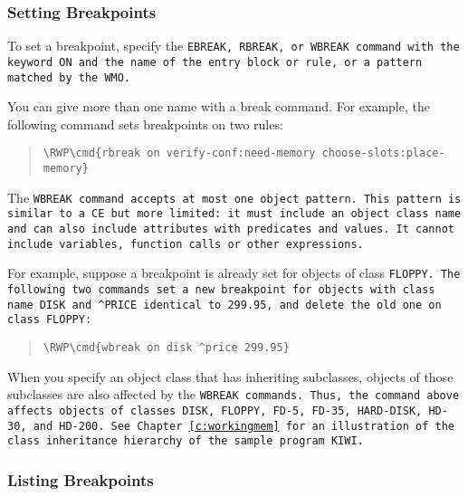 \subsubsection{Setting Breakpoints}

To set a breakpoint, specify the \tt{EBREAK}, \tt{RBREAK}, or
\tt{WBREAK} command with the keyword \tt{ON} and the name of the entry
block or rule, or a pattern matched by the WMO.

You can give more than one name with a break command. For example, the
following command sets breakpoints on two rules:
\begin{quote}
\begin{Verbatim}[commandchars=\\\{\}]
\RWP\cmd{rbreak on verify-conf:need-memory choose-slots:place-memory}
\end{Verbatim}
\end{quote}

The \tt{WBREAK} command accepts at most one object pattern. This
pattern is similar to a CE but more limited: it must include an
object class name and can also include attributes with
predicates and values. It cannot include variables, function
calls or other expressions.

For example, suppose a breakpoint is already set for objects of class
\tt{FLOPPY}. The following two commands set a new breakpoint for objects
with class name \tt{DISK} and \verb|^PRICE| identical to 299.95, and delete
the old one on class \tt{FLOPPY}:

\begin{quote}
\begin{Verbatim}[commandchars=\\\{\}]
\RWP\cmd{wbreak on disk ^price 299.95}
\end{Verbatim}
\end{quote}

When you specify an object class that has inheriting subclasses,
objects of those subclasses are also affected by the \tt{WBREAK}
commands. Thus, the command above affects objects of classes
\tt{DISK}, \tt{FLOPPY}, \tt{FD-5}, \tt{FD-35}, \tt{HARD-DISK},
\tt{HD-30}, and \tt{HD-200}. See Chapter~\ref{c:workingmem} for an
illustration of the class inheritance hierarchy of the sample program
\tt{KIWI}.

\subsubsection{Listing Breakpoints}

